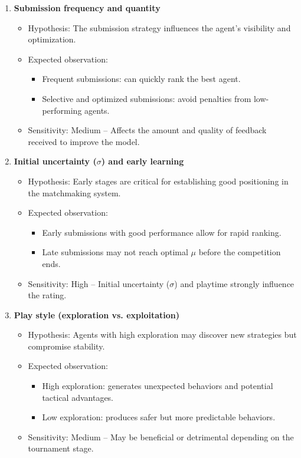\begin{enumerate}
    \item \textbf{Submission frequency and quantity}
    \begin{itemize}
        \item Hypothesis: The submission strategy influences the agent’s visibility and optimization.
        \item Expected observation:
        \begin{itemize}
            \item Frequent submissions: can quickly rank the best agent.
            \item Selective and optimized submissions: avoid penalties from low-performing agents.
        \end{itemize}
        \item Sensitivity: Medium – Affects the amount and quality of feedback received to improve the model.
    \end{itemize}

    \item \textbf{Initial uncertainty ($\sigma$) and early learning}
    \begin{itemize}
        \item Hypothesis: Early stages are critical for establishing good positioning in the matchmaking system.
        \item Expected observation:
        \begin{itemize}
            \item Early submissions with good performance allow for rapid ranking.
            \item Late submissions may not reach optimal $\mu$ before the competition ends.
        \end{itemize}
        \item Sensitivity: High – Initial uncertainty ($\sigma$) and playtime strongly influence the rating.
    \end{itemize}

    \item \textbf{Play style (exploration vs. exploitation)}
    \begin{itemize}
        \item Hypothesis: Agents with high exploration may discover new strategies but compromise stability.
        \item Expected observation:
        \begin{itemize}
            \item High exploration: generates unexpected behaviors and potential tactical advantages.
            \item Low exploration: produces safer but more predictable behaviors.
        \end{itemize}
        \item Sensitivity: Medium – May be beneficial or detrimental depending on the tournament stage.
    \end{itemize}


\end{enumerate}
